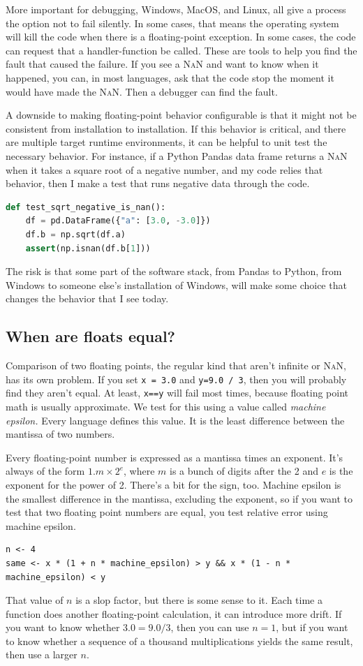 \documentclass[fleqn,10pt]{olplainarticle}
\newcommand{\nan}{\textsc{NaN}\xspace}
\begin{document}
More important for debugging, Windows, MacOS, and Linux, all give
a process the option not to fail silently. In some cases, that means
the operating system will kill the code when there is a floating-point
exception. In some cases, the code can request that a handler-function
be called. These are tools to help you find the fault that caused the
failure. If you see a \nan and want to know when it happened, you can,
in most languages, ask that the code stop the moment it would have made
the \nan. Then a debugger can find the fault.

A downside to making floating-point behavior configurable is that
it might not be consistent from installation to installation.
If this behavior is critical, and there are multiple target runtime
environments, it can be helpful to unit test the necessary behavior.
For instance, if a Python Pandas data frame returns a \nan when it
takes a square root of a negative number, and my code relies that behavior,
then I make a test that runs negative data through the code.
\begin{lstlisting}[language=Python]
def test_sqrt_negative_is_nan():
    df = pd.DataFrame({"a": [3.0, -3.0]})
    df.b = np.sqrt(df.a)
    assert(np.isnan(df.b[1]))
\end{lstlisting}
The risk is that some part of the software stack, from Pandas to Python, from
Windows to someone else's installation of Windows,
will make some choice that changes the behavior that I see today.


\subsection{When are floats equal?}

Comparison of two floating points, the regular kind that aren't
infinite or \nan, has its own problem. If you set
\lstinline!x = 3.0! and \lstinline!y=9.0 / 3!, then you will probably find they
aren't equal. At least, \lstinline!x==y! will fail most times, because
floating point math is usually approximate. We test for this
using a value called \emph{machine epsilon.} Every language defines
this value. It is the least difference between the
mantissa of two numbers.

Every floating-point number is expressed as a mantissa times
an exponent. It's always of the form $1.m \times 2^e$, where
$m$ is a bunch of digits after the 2 and $e$ is the exponent
for the power of 2. There's a bit for the sign, too.
Machine epsilon is the smallest difference in the mantissa,
excluding the exponent, so if you want to test that two
floating point numbers are equal, you test relative error using
machine epsilon.
\begin{lstlisting}
n <- 4
same <- x * (1 + n * machine_epsilon) > y && x * (1 - n * machine_epsilon) < y
\end{lstlisting}
That value of $n$ is a slop factor, but there is some sense
to it. Each time a function does another floating-point calculation,
it can introduce more drift. If you want to know whether
$3.0 = 9.0 / 3$, then you can use $n=1$, but if you want to know
whether a sequence of a thousand multiplications yields the
same result, then use a larger $n$.
\end{document}
